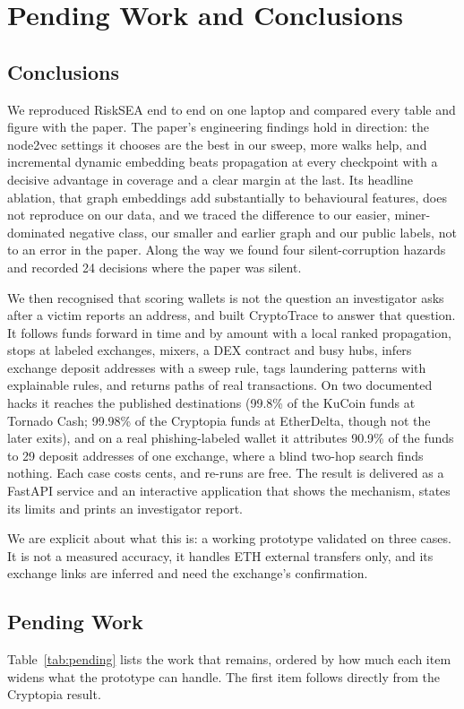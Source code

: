 \chapter{Pending Work and Conclusions}
\label{ch:pending}

\section{Conclusions}
We reproduced RiskSEA end to end on one laptop and compared every table and figure with the paper. The paper's engineering findings hold in direction: the node2vec settings it chooses are the best in our sweep, more walks help, and incremental dynamic embedding beats propagation at every checkpoint with a decisive advantage in coverage and a clear margin at the last. Its headline ablation, that graph embeddings add substantially to behavioural features, does not reproduce on our data, and we traced the difference to our easier, miner-dominated negative class, our smaller and earlier graph and our public labels, not to an error in the paper. Along the way we found four silent-corruption hazards and recorded 24 decisions where the paper was silent.

We then recognised that scoring wallets is not the question an investigator asks after a victim reports an address, and built CryptoTrace to answer that question. It follows funds forward in time and by amount with a local ranked propagation, stops at labeled exchanges, mixers, a DEX contract and busy hubs, infers exchange deposit addresses with a sweep rule, tags laundering patterns with explainable rules, and returns paths of real transactions. On two documented hacks it reaches the published destinations (99.8\% of the KuCoin funds at Tornado Cash; 99.98\% of the Cryptopia funds at EtherDelta, though not the later exits), and on a real phishing-labeled wallet it attributes 90.9\% of the funds to 29 deposit addresses of one exchange, where a blind two-hop search finds nothing. Each case costs cents, and re-runs are free. The result is delivered as a FastAPI service and an interactive application that shows the mechanism, states its limits and prints an investigator report.

We are explicit about what this is: a working prototype validated on three cases. It is not a measured accuracy, it handles ETH external transfers only, and its exchange links are inferred and need the exchange's confirmation.

\section{Pending Work}
Table~\ref{tab:pending} lists the work that remains, ordered by how much each item widens what the prototype can handle. The first item follows directly from the Cryptopia result.

